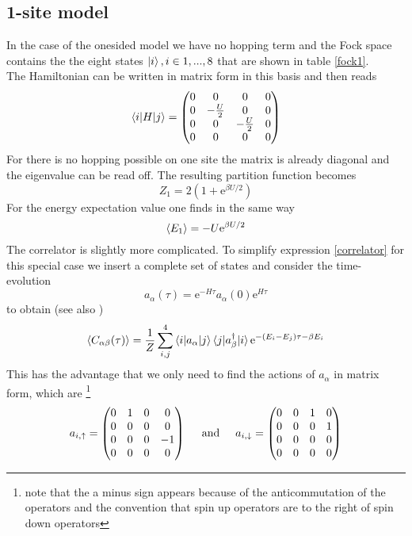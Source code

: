 \subsection{1-site model}
In the case of the onesided model we have no hopping term and the Fock space contains the the eight states $\ket{i}, i \in {1,...,8}$ that are shown in table \ref{fock1}.\\

The Hamiltonian can be written in matrix form in this basis and then reads
\begin{equation*}
\braket{i|H|j}=
\begin{pmatrix}
0 & 0 & 0&0\\
0 & -\frac{U}{2} & 0&0\\
0 & 0 & -\frac{U}{2}&0\\
0 & 0 & 0&0
\end{pmatrix}
\end{equation*}
For there is no hopping possible on one site the matrix is already diagonal and the eigenvalue can be read off. The resulting partition function becomes
\begin{equation}
Z_{1}= 2 (1+\text{e}^{\beta U/2})
	\label{partition1}
\end{equation}
For the energy expectation value one finds in the same way
\begin{equation}
	\braket{E_1}= -U\text{e}^{\beta U/2}
	\label{energy1}
\end{equation}
The correlator is slightly more complicated. To simplify expression \ref{correlator} for this special case we insert a complete set of states and consider the time-evolution
\begin{equation}
	a_{\alpha}(\tau)= \text{e}^{-H\tau} a_{\alpha}(0)\text{e}^{H\tau}
\end{equation}
to  obtain (see also \cite{luu})
\begin{equation}
\braket{C_{\alpha\beta}(\tau)}= \frac{1}{Z}\sum_{i,j}^{4}\braket{i|a_{\alpha}|j}\braket{j|a^{\dagger}_{\beta}|i}\text{e}^{-(E_i-E_j)\tau - \beta E_i}
	\label{correl_expand}
\end{equation}
This has the advantage that we only need to find the actions of $a_{\alpha}$ in matrix form, which are \footnote{note that the a minus sign appears because of the anticommutation of the operators and the convention that spin up operators are to the right of spin down operators}
\begin{align}
	a_{i,\uparrow} =
	 \begin{pmatrix}
	0 & 1 & 0&0\\
	0 & 0 & 0&0\\
	0 & 0 & 0&-1\\
	0 & 0 & 0&0
	\end{pmatrix} \hspace{0.5cm} \text{and} \hspace{0.5cm}	
	a_{i,\downarrow} =
	\begin{pmatrix}
	0 & 0 & 1&0\\
	0 & 0 & 0&1\\
	0 & 0 & 0&0\\
	0 & 0 & 0&0
	\end{pmatrix}
\end{align}

